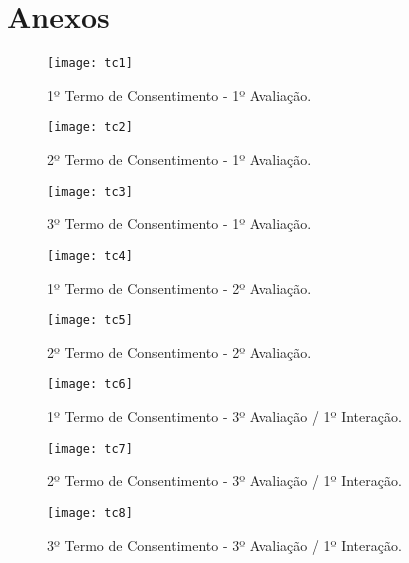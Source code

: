 \chapter[Anexos]{Anexos}
\label{chap:anexos}
	
	\begin{figure}[h]
		\centering
		\texttt{[image: tc1]}
		\caption[1º Termo de Consentimento - 1º Avaliação]{1º Termo de Consentimento - 1º Avaliação.}
		\label{fig:tc1}
	\end{figure}
	
	\newpage
	\begin{figure}[h]
		\centering
		\texttt{[image: tc2]}
		\caption[2º Termo de Consentimento - 1º Avaliação]{2º Termo de Consentimento - 1º Avaliação.}
		\label{fig:tc1}
	\end{figure}

	\newpage
	\begin{figure}[h]
		\centering
		\texttt{[image: tc3]}
		\caption[3º Termo de Consentimento - 1º Avaliação]{3º Termo de Consentimento - 1º Avaliação.}
		\label{fig:tc1}
	\end{figure}

	\newpage
	\begin{figure}[h]
		\centering
		\texttt{[image: tc4]}
		\caption[1º Termo de Consentimento - 2º Avaliação]{1º Termo de Consentimento - 2º Avaliação.}
		\label{fig:tc1}
	\end{figure}

	\newpage
	\begin{figure}[h]
		\centering
		\texttt{[image: tc5]}
		\caption[2º Termo de Consentimento - 2º Avaliação]{2º Termo de Consentimento - 2º Avaliação.}
		\label{fig:tc1}
	\end{figure}

	\newpage
	\begin{figure}[h]
		\centering
		\texttt{[image: tc6]}
		\caption[1º Termo de Consentimento - 3º Avaliação / 1º Interação]{1º Termo de Consentimento - 3º Avaliação / 1º Interação.}
		\label{fig:tc1}
	\end{figure}

	\newpage
	\begin{figure}[h]
		\centering
		\texttt{[image: tc7]}
		\caption[2º Termo de Consentimento - 3º Avaliação / 1º Interação]{2º Termo de Consentimento - 3º Avaliação / 1º Interação.}
		\label{fig:tc1}
	\end{figure}

	\newpage
	\begin{figure}[h]
		\centering
		\texttt{[image: tc8]}
		\caption[3º Termo de Consentimento - 3º Avaliação / 1º Interação]{3º Termo de Consentimento - 3º Avaliação / 1º Interação.}
		\label{fig:tc1}
	\end{figure}

